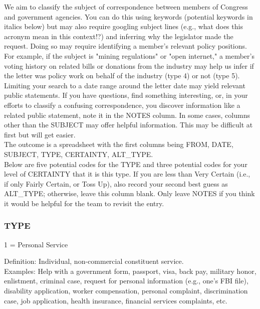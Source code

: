 \documentclass[12pt]{article}
\begin{document}
{We aim to classify the subject of correspondence between members of Congress and government agencies. You can do this using keywords (potential keywords in italics below) but may also require googling subject lines (e.g., what does this acronym mean in this context!?) and inferring why the legislator made the request. Doing so may require identifying a member's relevant policy positions. For example, if the subject is "mining regulations" or "open internet," a member's voting history on related bills or donations from the industry may help us infer if the letter was policy work on behalf of the industry (type 4) or not (type 5). Limiting your search to a date range around the letter date may yield relevant public statements. If you have questions, find something interesting, or, in your efforts to classify a confusing correspondence, you discover information like a related public statement, note it in the NOTES column. In some cases, columns other than the SUBJECT may offer helpful information. This may be difficult at first but will get easier. \\

The outcome is a spreadsheet with the first columns being FROM, DATE, SUBJECT, TYPE, CERTAINTY, ALT\_TYPE.\\


Below are five potential codes for the TYPE and three potential codes for your level of CERTAINTY that it is this type. If you are less than Very Certain (i.e., if only Fairly Certain, or Toss Up), also record your second best guess as ALT\_TYPE; otherwise, leave this column blank. Only leave NOTES if you think it would be helpful for the team to revisit the entry.

\subsubsection{TYPE}

1 = Personal Service\\

\hfill\begin{minipage}{\dimexpr\textwidth-2cm}
Definition: Individual, non-commercial constituent service.\\
Examples: Help with a government form, passport, visa, back pay, military honor, enlistment, criminal case, request for personal information (e.g., one’s FBI file), disability application, worker compensation, personal complaint, discrimination case, job application, health insurance, financial services complaints, etc.\\
\end{minipage}

}
\end{document}
